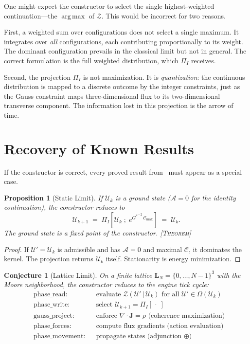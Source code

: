 \documentclass[11pt,a4paper]{article}
\newcommand{\UU}{\mathcal{U}}
\newcommand{\OO}{\Omega}
\newcommand{\PP}{\Pi}
\newcommand{\etag}[1]{{\normalfont\textsc{\footnotesize [#1]}}}
\theoremstyle{compact}
\newtheorem{proposition}{Proposition}
\newtheorem{conjecture}{Conjecture}
\begin{document}
One might expect the constructor to select the single highest-weighted continuation---the $\operatorname{arg\,max}$ of $\mathcal{Z}$. This would be incorrect for two reasons.

First, a weighted sum over configurations does not select a single maximum. It integrates over \emph{all} configurations, each contributing proportionally to its weight. The dominant configuration prevails in the classical limit but not in general. The correct formulation is the full weighted distribution, which $\PP_I$ receives.

Second, the projection $\PP_I$ is not maximization. It is \emph{quantization}: the continuous distribution is mapped to a discrete outcome by the integer constraints, just as the Gauss constraint maps three-dimensional flux to its two-dimensional transverse component. The information lost in this projection is the arrow of time.


\section{Recovery of Known Results}
\label{sec:recovery}

If the constructor is correct, every proved result from~\cite{lifecycle} must appear as a special case.

\begin{proposition}[Static Limit]
\label{prop:static}
If $\UU_k$ is a ground state ($\mathcal{A} = 0$ for the identity continuation), the constructor reduces to
\[
\UU_{k+1} \;=\; \PP_I\!\left[\UU_k \;;\; e^{{G^*}^{-2}\,\mathcal{C}_{\max}}\right] \;=\; \UU_k.
\]
The ground state is a fixed point of the constructor. \etag{Theorem}
\end{proposition}

\begin{proof}
If $\UU' = \UU_k$ is admissible and has $\mathcal{A} = 0$ and maximal $\mathcal{C}$, it dominates the kernel. The projection returns $\UU_k$ itself. Stationarity is energy minimization.
\end{proof}

\begin{conjecture}[Lattice Limit]
\label{prop:lattice}
On a finite lattice $\mathbf{L}_N = \{0, \ldots, N-1\}^3$ with the Moore neighborhood, the constructor reduces to the engine tick cycle:
\begin{align*}
&\text{phase\_read:} && \text{evaluate } \mathcal{Z}(\UU'\,|\,\UU_k) \text{ for all } \UU' \in \OO(\UU_k) \\
&\text{phase\_write:} && \text{select } \UU_{k+1} = \PP_I[\,\cdot\;] \\
&\text{gauss\_project:} && \text{enforce } \nabla \cdot \mathbf{J} = \rho \text{ (coherence maximization)} \\
&\text{phase\_forces:} && \text{compute flux gradients (action evaluation)} \\
&\text{phase\_movement:} && \text{propagate states (adjunction } \oplus\text{)}
\end{align*}
\end{conjecture}
\end{document}
